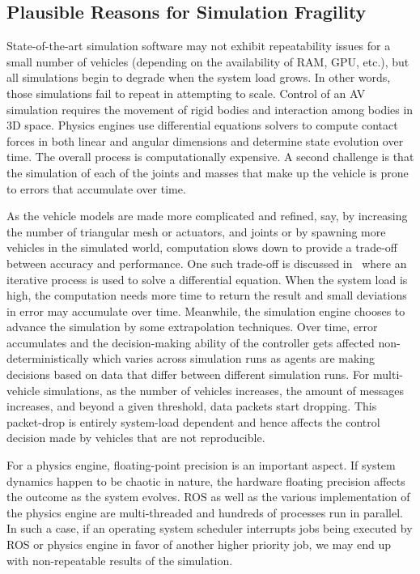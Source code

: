 \documentclass[aps,pra,twocolumn,notitlepage,nofootinbib,superscriptaddress]{revtex4-1}
\begin{document}
\subsection{Plausible Reasons for Simulation Fragility}
State-of-the-art simulation software may not exhibit repeatability issues for a small number of vehicles
(depending on the availability of RAM, GPU, etc.), but all simulations begin to degrade when the system load grows. In other words, those simulations fail to repeat in attempting to scale. Control of an AV simulation requires the movement of rigid bodies and interaction among bodies in 3D space. Physics engines use differential equations solvers to compute contact forces in both linear and angular dimensions and determine state evolution over time. The overall process is computationally expensive. A second challenge is that the simulation of each of the joints and masses that make up the vehicle is prone to errors that accumulate over time.

As the vehicle models are made more complicated and refined, say, by increasing the number of triangular mesh or actuators, and joints or by spawning more vehicles in the simulated world, computation slows down to provide a trade-off between accuracy and performance. One such trade-off is discussed in~\cite{lee2015modeling} where an iterative process is used to solve a differential equation. When the system load is high, the computation needs more time to return the result and small deviations in error may accumulate over time. Meanwhile, the simulation engine chooses to advance the simulation by some extrapolation techniques. Over time, error accumulates and the decision-making ability of the controller gets affected non-deterministically which varies across simulation runs as agents are making decisions based on data that differ between different simulation runs. For multi-vehicle simulations, as the number of vehicles increases, the amount of messages increases, and beyond a given threshold, data packets start dropping. This packet-drop is entirely system-load dependent and hence affects the control decision made by vehicles that are not reproducible.

For a physics engine, floating-point precision is an important aspect. If system dynamics happen to be chaotic in nature, the hardware floating precision affects the outcome as the system evolves. ROS as well as the various implementation of the physics engine are multi-threaded and hundreds of processes run in parallel. In such a case, if an operating system scheduler interrupts jobs being executed by ROS or physics engine in favor of another higher priority job, we may end up with non-repeatable results of the simulation.
\end{document}
